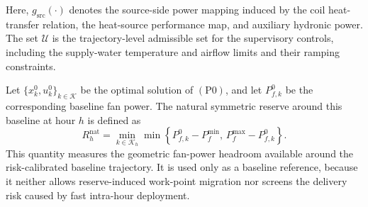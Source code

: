 \documentclass[journal]{IEEEtran}
\theoremstyle{remark}
\begin{document}
Here, \(g_{\mathrm{src}}(\cdot)\) denotes the source-side power mapping
induced by the coil heat-transfer relation, the heat-source performance
map, and auxiliary hydronic power. The set \(\mathcal{U}\) is the
trajectory-level admissible set for the supervisory controls, including
the supply-water temperature and airflow limits and their ramping
constraints.

Let \(\{x_k^0,u_k^0\}_{k\in\mathcal{K}}\) be the optimal solution of
\((\mathrm{P0})\), and let \(P_{f,k}^0\) be the corresponding baseline
fan power. The natural symmetric reserve around this baseline at hour
\(h\) is defined as
\begin{equation}
	R_h^{\mathrm{nat}}
	=
	\min_{k\in\mathcal{K}_h}
	\min
	\left\{
	P_{f,k}^{0}-P_f^{\min},
	\,
	P_f^{\max}-P_{f,k}^{0}
	\right\}.
	\label{eq:natural_reserve}
\end{equation}
This quantity measures the geometric fan-power headroom available
around the risk-calibrated baseline trajectory. It is used only as a
baseline reference, because it neither allows reserve-induced
work-point migration nor screens the delivery risk caused by fast
intra-hour deployment.



\end{document}
